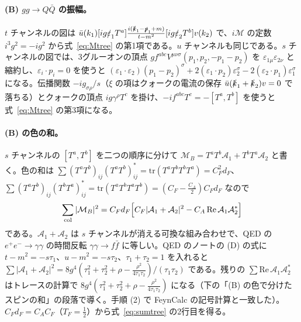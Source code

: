 \documentclass[a4paper,10pt]{ltjsarticle}
\newcommand{\tr}{\mathrm{tr}}
\begin{document}
\paragraph{(B) $gg\to Q\bar Q$ の振幅。}$t$ チャンネルの図は $\bar u(k_1)[ig\slashed\varepsilon_1T^a]\frac{i(\slashed k_1-\slashed p_1+m)}{t-m^2}[ig\slashed\varepsilon_2T^b]v(k_2)$ で、$i\mathcal M$ の定数 $i^3g^2=-ig^2$ から式~\eqref{eq:Mtree} の第1項である。$u$ チャンネルも同じである。$s$ チャンネルの図では、3グルーオンの頂点 $gf^{abc}V^{\mu\nu\sigma}(p_1,p_2,-p_1-p_2)$ を $\varepsilon_{1\mu}\varepsilon_{2\nu}$ と縮約し、$\varepsilon_i\cdot p_i=0$ を使うと $(\varepsilon_1\cdot\varepsilon_2)(p_1-p_2)^\sigma+2(\varepsilon_1\cdot p_2)\varepsilon_2^\sigma-2(\varepsilon_2\cdot p_1)\varepsilon_1^\sigma$ になる。伝播関数 $-ig_{\sigma\rho}/s$（$\xi$ の項はクォークの電流の保存 $\bar u(\slashed k_1+\slashed k_2)v=0$ で落ちる）とクォークの頂点 $ig\gamma^\rho T^c$ を掛け、$-if^{abc}T^c=-[T^a,T^b]$ を使うと式~\eqref{eq:Mtree} の第3項になる。

\paragraph{(B) の色の和。}$s$ チャンネルの $[T^a,T^b]$ を二つの順序に分けて $\mathcal M_B=T^aT^b\mathcal A_1+T^bT^a\mathcal A_2$ と書く。色の和は $\sum(T^aT^b)_{ij}(T^aT^b)^*_{ij}=\tr(T^aT^bT^bT^a)=C_F^2d_F$、$\sum(T^aT^b)_{ij}(T^bT^a)^*_{ij}=\tr(T^aT^bT^aT^b)=(C_F-\frac{C_A}2)C_Fd_F$ なので
\begin{equation*}
\sum_{\mathrm{col}}|\mathcal M_B|^2=C_Fd_F\Bigl[C_F|\mathcal A_1+\mathcal A_2|^2-C_A\,\mathrm{Re}\,\mathcal A_1\mathcal A_2^*\Bigr]
\end{equation*}
である。$\mathcal A_1+\mathcal A_2$ は $s$ チャンネルが消える可換な組み合わせで、QED の $e^+e^-\to\gamma\gamma$ の時間反転 $\gamma\gamma\to f\bar f$ に等しい。QED のノートの (D) の式に $t-m^2=-s\tau_1$、$u-m^2=-s\tau_2$、$\tau_1+\tau_2=1$ を入れると $\sum|\mathcal A_1+\mathcal A_2|^2=8g^4(\tau_1^2+\tau_2^2+\rho-\frac{\rho^2}{4\tau_1\tau_2})/(\tau_1\tau_2)$ である。残りの $\sum\mathrm{Re}\,\mathcal A_1\mathcal A_2^*$ はトレースの計算で $8g^4(\tau_1^2+\tau_2^2+\rho-\frac{\rho^2}{4\tau_1\tau_2})$ になる（下の「(B) の色で分けたスピンの和」の段落で導く。手順 (2) で FeynCalc の記号計算と一致した）。$C_Fd_F=C_AC_F$（$T_F=\frac12$）から式~\eqref{eq:sumtree} の2行目を得る。
\end{document}
